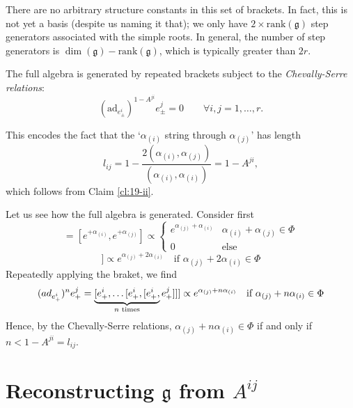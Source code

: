 
There are no arbitrary structure constants in this set of brackets.
In fact, this is not yet a basis (despite us naming it that); we only have $2 \times \text{rank}(\mathfrak{g})$ step generators associated with the simple roots. In general, the number of step generators is $\dim(\mathfrak{g}) - \text{rank}(\mathfrak{g})$, which is typically greater than $2r$.

The full algebra is generated by repeated brackets subject to the \emph{Chevally-Serre relations}:
\begin{equation}
  \boxed{(\text{ad}_{e^i_\pm})^{1 - A^{ji}} e_\pm^{j} = 0} \qquad \forall i, j = 1, \dots, r.
\end{equation}

This encodes the fact that the `$\alpha_{(i)}$ string through $\alpha_{(j)}$' has length
\begin{equation}
  l_{ij} = 1 - \frac{2(\alpha_{(i)}, \alpha_{(j)})}{(\alpha_{(i)}, \alpha_{(i)})} = 1 - A^{ji},
\end{equation}
which follows from Claim \ref{cl:19-ii}.

Let us see how the full algebra is generated. Consider first
\begin{equation}
  [e_+^{i}, e_+^{j}] = [e^{+\alpha_{(i)}}, e^{+\alpha_{(j)}}] \propto
  \begin{cases}
    e^{\alpha_{(j)} + \alpha_{(i)}} & \alpha_{(i)} + \alpha_{(j)} \in \Phi \\
    0 & \text{else}
  \end{cases}
\end{equation}
\begin{equation}
  [e_+^{i}, [e_+^{i}, e_+^{j}]] \propto e^{\alpha_{(j)} + 2 \alpha_{(i)}} \quad \text{if } \alpha_{(j)} + 2 \alpha_{(i)} \in \Phi
\end{equation}
Repeatedly applying the braket, we find 
\begin{equation}
  (ad_{e_+^{i}})^n e^{j}_{+} = \underbrace{[e_+^{i}, \dots [e_+^{i}, [e_+^{i},}_{\mathclap{n \text{ times}}} e_+^{j}]]] \propto e^{\alpha_{(j)} + n \alpha_{(i)}} \quad \text{if } \alpha_{(j)} + n \alpha_{(i)} \in \Phi
\end{equation}
Hence, by the Chevally-Serre relations, $\alpha_{(j)} + n \alpha_{(i)} \in \Phi$ if and only if $n < 1 - A^{ji} = l_{ij}$.


\section{Reconstructing \texorpdfstring{$\mathfrak{g}$}{the Lie Algebra} from \texorpdfstring{$A^{ij}$}{the Cartan Matrix}}%
\label{sec:reconstructing_g_from_a_ij}

